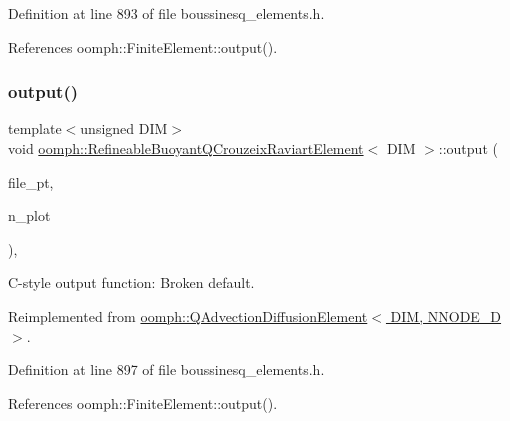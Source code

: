 Definition at line 893 of file boussinesq\+\_\+elements.\+h.



References oomph\+::\+Finite\+Element\+::output().

\mbox{\label{classoomph_1_1RefineableBuoyantQCrouzeixRaviartElement_a650e1b0428cd160c72dbc3deda287b26}} 
\subsubsection{\texorpdfstring{output()}{output()}\hspace{0.1cm}{\footnotesize\ttfamily [4/4]}}
{\footnotesize\ttfamily template$<$unsigned D\+IM$>$ \\
void \hyperlink{classoomph_1_1RefineableBuoyantQCrouzeixRaviartElement}{oomph\+::\+Refineable\+Buoyant\+Q\+Crouzeix\+Raviart\+Element}$<$ D\+IM $>$\+::output (\begin{DoxyParamCaption}\item[{F\+I\+LE $\ast$}]{file\+\_\+pt,  }\item[{const unsigned \&}]{n\+\_\+plot }\end{DoxyParamCaption})\hspace{0.3cm}{\ttfamily [inline]}, {\ttfamily [virtual]}}



C-\/style output function\+: Broken default. 



Reimplemented from \hyperlink{classoomph_1_1QAdvectionDiffusionElement_a891cdaba60a0cd6b3438f161fb537933}{oomph\+::\+Q\+Advection\+Diffusion\+Element$<$ D\+I\+M, N\+N\+O\+D\+E\+\_\+D $>$}.



Definition at line 897 of file boussinesq\+\_\+elements.\+h.



References oomph\+::\+Finite\+Element\+::output().

\mbox{\label{classoomph_1_1RefineableBuoyantQCrouzeixRaviartElement_a9f9feaf2d6003f2328741de2987fd0d1}} 
